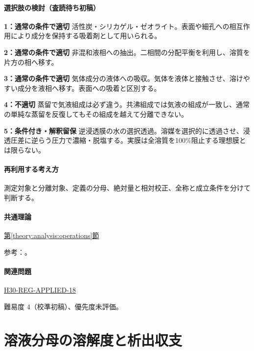 \paragraph{選択肢の検討（査読待ち初稿）}\mbox{}\par

\noindent\textbf{1：通常の条件で適切} 活性炭・シリカゲル・ゼオライト。表面や細孔への相互作用により成分を保持する吸着剤として用いられる。\par

\noindent\textbf{2：通常の条件で適切} 非混和液相への抽出。二相間の分配平衡を利用し、溶質を片方の相へ移す。\par

\noindent\textbf{3：通常の条件で適切} 気体成分の液体への吸収。気体を液体と接触させ、溶けやすい成分を液相へ移す。表面への吸着と区別する。\par

\noindent\textbf{4：不適切} 蒸留で気液組成は必ず違う。共沸組成では気液の組成が一致し、通常の単純な蒸留を反復してもその組成を越えて分離できない。\par

\noindent\textbf{5：条件付き・解釈留保} 逆浸透膜の水の選択透過。溶媒を選択的に透過させ、浸透圧差に逆らう圧力で濃縮・脱塩する。実膜は全溶質を100\%阻止する理想膜とは限らない。\par

\paragraph{再利用する考え方} 測定対象と分離対象、定義の分母、絶対量と相対校正、全称と成立条件を分けて判断する。

\paragraph{共通理論} \hyperref[theory:analysis:operations]{第\ref*{theory:analysis:operations}節}

\par 参考：\cite{nptel_azeotrope,inorganic_zeolite}。

\paragraph{関連問題} \hyperref[q:h30-reg-applied-18]{H30-REG-APPLIED-18}

\par 難易度 4（校準初稿）、優先度未評価。

\section{溶液分母の溶解度と析出収支}

